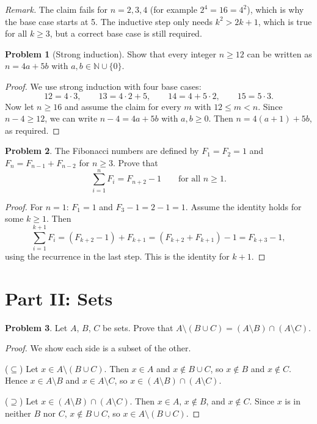 \documentclass[11pt]{article}
\newcommand{\N}{\mathbb{N}}
\theoremstyle{definition}
\newtheorem{problem}{Problem}
\begin{document}
\noindent\emph{Remark.} The claim fails for $n = 2, 3, 4$ (for example $2^4 = 16 = 4^2$), which is why the base case starts at 5. The inductive step only needs $k^2 > 2k + 1$, which is true for all $k \geq 3$, but a correct base case is still required.

\begin{problem}[Strong induction]\label{prob:stamps}
Show that every integer $n \geq 12$ can be written as $n = 4a + 5b$ with $a, b \in \N \cup \{0\}$.
\end{problem}

\begin{proof}
We use strong induction with four base cases:
\[
  12 = 4 \cdot 3, \qquad 13 = 4 \cdot 2 + 5, \qquad 14 = 4 + 5 \cdot 2, \qquad 15 = 5 \cdot 3.
\]
Now let $n \geq 16$ and assume the claim for every $m$ with $12 \leq m < n$. Since $n - 4 \geq 12$, we can write $n - 4 = 4a + 5b$ with $a, b \geq 0$. Then $n = 4(a+1) + 5b$, as required.
\end{proof}

\begin{problem}\label{prob:fib}
The Fibonacci numbers are defined by $F_1 = F_2 = 1$ and $F_{n} = F_{n-1} + F_{n-2}$ for $n \geq 3$. Prove that
\[
  \sum_{i=1}^{n} F_i = F_{n+2} - 1 \qquad \text{for all } n \geq 1.
\]
\end{problem}

\begin{proof}
For $n = 1$: $F_1 = 1$ and $F_3 - 1 = 2 - 1 = 1$. Assume the identity holds for some $k \geq 1$. Then
\[
  \sum_{i=1}^{k+1} F_i = \left(F_{k+2} - 1\right) + F_{k+1} = \left(F_{k+2} + F_{k+1}\right) - 1 = F_{k+3} - 1,
\]
using the recurrence in the last step. This is the identity for $k + 1$.
\end{proof}

\section*{Part II: Sets}

\begin{problem}\label{prob:demorgan}
Let $A$, $B$, $C$ be sets. Prove that $A \setminus (B \cup C) = (A \setminus B) \cap (A \setminus C)$.
\end{problem}

\begin{proof}
We show each side is a subset of the other.

($\subseteq$) Let $x \in A \setminus (B \cup C)$. Then $x \in A$ and $x \notin B \cup C$, so $x \notin B$ and $x \notin C$. Hence $x \in A \setminus B$ and $x \in A \setminus C$, so $x \in (A \setminus B) \cap (A \setminus C)$.

($\supseteq$) Let $x \in (A \setminus B) \cap (A \setminus C)$. Then $x \in A$, $x \notin B$, and $x \notin C$. Since $x$ is in neither $B$ nor $C$, $x \notin B \cup C$, so $x \in A \setminus (B \cup C)$.
\end{proof}
\end{document}
